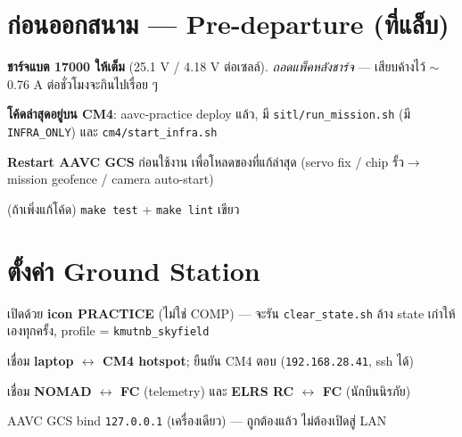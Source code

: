 \documentclass[11pt,a4paper]{article}
\newcommand{\code}[1]{\texttt{\small #1}}
\begin{document}
\section{ก่อนออกสนาม — Pre-departure (ที่แล็บ)}
\begin{cl}
\item \textbf{ชาร์จแบต 17000 ให้เต็ม} (25.1 V / 4.18 V ต่อเซลล์). \emph{ถอดแพ็คหลังชาร์จ} — เสียบค้างไว้ $\sim$0.76 A ต่อชั่วโมงจะกินไปเรื่อย ๆ
\item \textbf{โค้ดล่าสุดอยู่บน CM4}: aavc-practice deploy แล้ว, มี \code{sitl/run_mission.sh} (มี \code{INFRA_ONLY}) และ \code{cm4/start_infra.sh}
\item \textbf{Restart AAVC GCS} ก่อนใช้งาน เพื่อโหลดของที่แก้ล่าสุด (servo fix / chip รั้ว$\to$mission geofence / camera auto-start)
\item (ถ้าเพิ่งแก้โค้ด) \code{make test} + \code{make lint} เขียว
\end{cl}

\section{ตั้งค่า Ground Station}
\begin{cl}
\item เปิดด้วย \textbf{icon PRACTICE} (ไม่ใช่ COMP) — จะรัน \code{clear_state.sh} ล้าง state เก่าให้เองทุกครั้ง, profile = \code{kmutnb_skyfield}
\item เชื่อม \textbf{laptop $\leftrightarrow$ CM4 hotspot}; ยืนยัน CM4 ตอบ (\code{192.168.28.41}, ssh ได้)
\item เชื่อม \textbf{NOMAD $\leftrightarrow$ FC} (telemetry) และ \textbf{ELRS RC $\leftrightarrow$ FC} (นักบินนิรภัย)
\item AAVC GCS bind \code{127.0.0.1} (เครื่องเดียว) — ถูกต้องแล้ว ไม่ต้องเปิดสู่ LAN
\end{cl}

\end{document}
